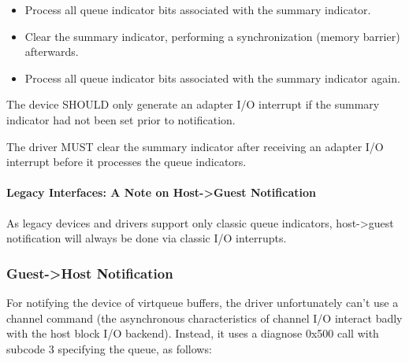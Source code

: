 \begin{itemize}
\item Process all queue indicator bits associated with the summary indicator.
\item Clear the summary indicator, performing a synchronization (memory
barrier) afterwards.
\item Process all queue indicator bits associated with the summary indicator
again.
\end{itemize}


The device SHOULD only generate an adapter I/O interrupt if the
summary indicator had not been set prior to notification.

The driver
MUST clear the summary indicator after receiving an adapter I/O
interrupt before it processes the queue indicators.

\paragraph{Legacy Interfaces: A Note on Host->Guest Notification}\label{sec:Virtio Transport Options / Virtio over channel I/O / Device Operation / Host->Guest Notification / Legacy Interfaces: A Note on Host->Guest Notification}

As legacy devices and drivers support only classic queue indicators,
host->guest notification will always be done via classic I/O interrupts.

\subsubsection{Guest->Host Notification}\label{sec:Virtio Transport Options / Virtio over channel I/O / Device Operation / Guest->Host Notification}

For notifying the device of virtqueue buffers, the driver
unfortunately can't use a channel command (the asynchronous
characteristics of channel I/O interact badly with the host block
I/O backend). Instead, it uses a diagnose 0x500 call with subcode
3 specifying the queue, as follows:

